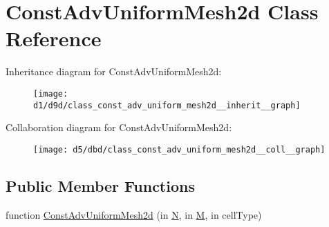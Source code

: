 \hypertarget{class_const_adv_uniform_mesh2d}{}\section{Const\+Adv\+Uniform\+Mesh2d Class Reference}
\label{class_const_adv_uniform_mesh2d}


Inheritance diagram for Const\+Adv\+Uniform\+Mesh2d\+:
\nopagebreak
\begin{figure}[H]
\begin{center}
\leavevmode
\texttt{[image: d1/d9d/class\_const\_adv\_uniform\_mesh2d\_\_inherit\_\_graph]}
\end{center}
\end{figure}


Collaboration diagram for Const\+Adv\+Uniform\+Mesh2d\+:
\nopagebreak
\begin{figure}[H]
\begin{center}
\leavevmode
\texttt{[image: d5/dbd/class\_const\_adv\_uniform\_mesh2d\_\_coll\_\_graph]}
\end{center}
\end{figure}
\subsection*{Public Member Functions}
\begin{DoxyCompactItemize}
\item 
function \hyperlink{class_const_adv_uniform_mesh2d_aa9109341156afcc57277843278e0d7bf}{Const\+Adv\+Uniform\+Mesh2d} (in \hyperlink{class_const_adv_uniform_mesh2d_a4fe5c3963150d921550e7041efde62af}{N}, in \hyperlink{class_const_adv_uniform_mesh2d_a1bbfe1ed756e54d1ed72c02f39ac433c}{M}, in cell\+Type)
\end{DoxyCompactItemize}
